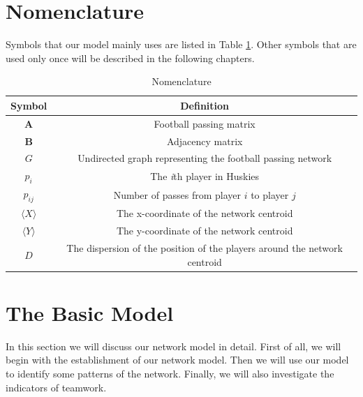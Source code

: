 \documentclass{mcmthesis}
\begin{document}
\section{Nomenclature}
	Symbols that our model mainly uses are listed in Table \ref{tab:Nomen}.  Other symbols that are used only once will be described in the following chapters.
	\begin{table}
    	\centering
    	\caption{Nomenclature}
		\label{tab:Nomen}
		\begin{tabular}{c c}
			\hline	
				Symbol & Definition\\
			\hline
				$\textbf{A}$ & Football passing matrix\\
				$\textbf{B}$ & Adjacency matrix\\
				$G$ & Undirected graph representing the football passing network\\
				$p_{i}$ & The \emph{i}th player in Huskies\\
				$p_{ij}$ & Number of passes from player $i$ to player $j$\\
				$\langle$$X$$\rangle$ & The x-coordinate of the network centroid\\
				$\langle$$Y$$\rangle$ & The y-coordinate of the network centroid\\
				$D$ & The dispersion of the position of the players around the network centroid\\
			\hline
   	 	\end{tabular}
	\end{table}

\section{The Basic Model}
	In this section we will discuss our network model in detail.  First of all, we will begin with the establishment of our network model.  Then we will use our model to identify some patterns of the network.  Finally, we will also investigate the indicators of teamwork. 
\end{document}

